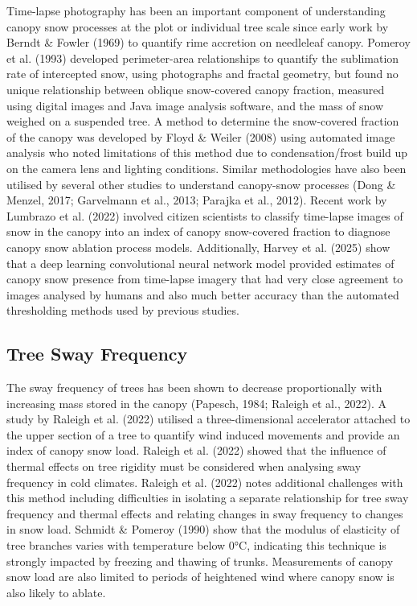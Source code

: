 \documentclass[
  letterpaper,
]{tex/uofsthesis-cs}
\begin{document}
Time-lapse photography has been an important component of understanding
canopy snow processes at the plot or individual tree scale since early
work by Berndt \& Fowler (1969) to quantify rime accretion on needleleaf
canopy. Pomeroy et al. (1993) developed perimeter-area relationships to
quantify the sublimation rate of intercepted snow, using photographs and
fractal geometry, but found no unique relationship between oblique
snow-covered canopy fraction, measured using digital images and Java
image analysis software, and the mass of snow weighed on a suspended
tree. A method to determine the snow-covered fraction of the canopy was
developed by Floyd \& Weiler (2008) using automated image analysis who
noted limitations of this method due to condensation/frost build up on
the camera lens and lighting conditions. Similar methodologies have also
been utilised by several other studies to understand canopy-snow
processes (Dong \& Menzel, 2017; Garvelmann et al., 2013; Parajka et
al., 2012). Recent work by Lumbrazo et al. (2022) involved citizen
scientists to classify time-lapse images of snow in the canopy into an
index of canopy snow-covered fraction to diagnose canopy snow ablation
process models. Additionally, Harvey et al. (2025) show that a deep
learning convolutional neural network model provided estimates of canopy
snow presence from time-lapse imagery that had very close agreement to
images analysed by humans and also much better accuracy than the
automated thresholding methods used by previous studies.

\subsection{Tree Sway Frequency}\label{tree-sway-frequency}

The sway frequency of trees has been shown to decrease proportionally
with increasing mass stored in the canopy (Papesch, 1984; Raleigh et
al., 2022). A study by Raleigh et al. (2022) utilised a
three-dimensional accelerator attached to the upper section of a tree to
quantify wind induced movements and provide an index of canopy snow
load. Raleigh et al. (2022) showed that the influence of thermal effects
on tree rigidity must be considered when analysing sway frequency in
cold climates. Raleigh et al. (2022) notes additional challenges with
this method including difficulties in isolating a separate relationship
for tree sway frequency and thermal effects and relating changes in sway
frequency to changes in snow load. Schmidt \& Pomeroy (1990) show that
the modulus of elasticity of tree branches varies with temperature below
0°C, indicating this technique is strongly impacted by freezing and
thawing of trunks. Measurements of canopy snow load are also limited to
periods of heightened wind where canopy snow is also likely to ablate.
\end{document}
